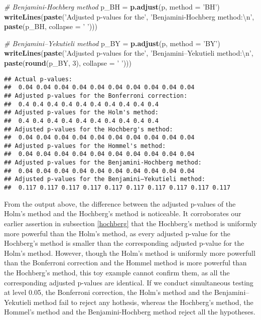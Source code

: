\documentclass[
]{book}
\newenvironment{Shaded}{\begin{snugshade}}{\end{snugshade}}
\newcommand{\CharTok}[1]{\textcolor[rgb]{0.31,0.60,0.02}{#1}}
\newcommand{\CommentTok}[1]{\textcolor[rgb]{0.56,0.35,0.01}{\textit{#1}}}
\newcommand{\DataTypeTok}[1]{\textcolor[rgb]{0.13,0.29,0.53}{#1}}
\newcommand{\DecValTok}[1]{\textcolor[rgb]{0.00,0.00,0.81}{#1}}
\newcommand{\KeywordTok}[1]{\textcolor[rgb]{0.13,0.29,0.53}{\textbf{#1}}}
\newcommand{\NormalTok}[1]{#1}
\newcommand{\StringTok}[1]{\textcolor[rgb]{0.31,0.60,0.02}{#1}}
\begin{document}
\begin{Shaded}
\begin{Highlighting}[]
\CommentTok{# Benjamini-Hochberg method}
\NormalTok{p_BH =}\StringTok{ }\KeywordTok{p.adjust}\NormalTok{(p, }\DataTypeTok{method =} \StringTok{'BH'}\NormalTok{)}
\KeywordTok{writeLines}\NormalTok{(}\KeywordTok{paste}\NormalTok{(}\StringTok{'Adjusted p-values for the'}\NormalTok{,}
                 \StringTok{'Benjamini-Hochberg method:}\CharTok{\textbackslash{}n}\StringTok{'}\NormalTok{,}
                 \KeywordTok{paste}\NormalTok{(p_BH, }\DataTypeTok{collapse =} \StringTok{' '}\NormalTok{)))}

\CommentTok{# Benjamini–Yekutieli method}
\NormalTok{p_BY =}\StringTok{ }\KeywordTok{p.adjust}\NormalTok{(p, }\DataTypeTok{method =} \StringTok{'BY'}\NormalTok{)}
\KeywordTok{writeLines}\NormalTok{(}\KeywordTok{paste}\NormalTok{(}\StringTok{'Adjusted p-values for the'}\NormalTok{,}
                 \StringTok{'Benjamini–Yekutieli method:}\CharTok{\textbackslash{}n}\StringTok{'}\NormalTok{,}
                 \KeywordTok{paste}\NormalTok{(}\KeywordTok{round}\NormalTok{(p_BY, }\DecValTok{3}\NormalTok{), }\DataTypeTok{collapse =} \StringTok{' '}\NormalTok{)))}
\end{Highlighting}
\end{Shaded}

\begin{verbatim}
## Actual p-values:
##  0.04 0.04 0.04 0.04 0.04 0.04 0.04 0.04 0.04 0.04
## Adjusted p-values for the Bonferroni correction:
##  0.4 0.4 0.4 0.4 0.4 0.4 0.4 0.4 0.4 0.4
## Adjusted p-values for the Holm's method:
##  0.4 0.4 0.4 0.4 0.4 0.4 0.4 0.4 0.4 0.4
## Adjusted p-values for the Hochberg's method:
##  0.04 0.04 0.04 0.04 0.04 0.04 0.04 0.04 0.04 0.04
## Adjusted p-values for the Hommel's method:
##  0.04 0.04 0.04 0.04 0.04 0.04 0.04 0.04 0.04 0.04
## Adjusted p-values for the Benjamini-Hochberg method:
##  0.04 0.04 0.04 0.04 0.04 0.04 0.04 0.04 0.04 0.04
## Adjusted p-values for the Benjamini–Yekutieli method:
##  0.117 0.117 0.117 0.117 0.117 0.117 0.117 0.117 0.117 0.117
\end{verbatim}

From the output above, the difference between the adjusted p-values of the Holm's method and the Hochberg's method is noticeable. It corroborates our earlier assertion in subsection \ref{hochberg} that the Hochberg's method is uniformly more powerful than the Holm's method, as every adjusted p-value for the Hochberg's method is smaller than the corresponding adjusted p-value for the Holm's method. However, though the Holm's method is uniformly more powerfull than the Bonferroni correction and the Hommel method is more powerful than the Hochberg's method, this toy example cannot confirm them, as all the corresponding adjusted p-values are identical. If we conduct simultaneous testing at level 0.05, the Bonferroni correction, the Holm's method and the Benjamini--Yekutieli method fail to reject any hothesis, whereas the Hochberg's method, the Hommel's method and the Benjamini-Hochberg method reject all the hypotheses.
\end{document}
